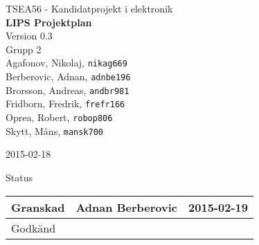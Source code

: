 \documentclass[11pt]{article}
\date{}
\begin{document}
\begin{titlepage}
\begin{center}
TSEA56 - Kandidatprojekt i elektronik \\[0.5in]
{\Large\bfseries LIPS Projektplan}\\
%
\vspace{4\baselineskip}
%
Version 0.3\\
\vspace{2\baselineskip}
%
Grupp 2 \\
Agafonov, Nikolaj, 
\texttt{nikag669}
\\
Berberovic, Adnan, 
\texttt{adnbe196}
\\
Brorsson, Andreas, 
\texttt{andbr981}
\\
Fridborn, Fredrik, 
\texttt{frefr166}
\\
Oprea, Robert, 
\texttt{robop806}
\\
Skytt, Måns, 
\texttt{mansk700}

\vspace{2\baselineskip}
2015-02-18

\vspace{19\baselineskip}
Status
\begin{longtable}{|l|l|l|} \hline

Granskad &
Adnan Berberovic & 
2015-02-19 \\ \hline
Godkänd &
 &
 \\ \hline
 
\end{longtable}

\end{center}
\end{titlepage}
\end{document}
